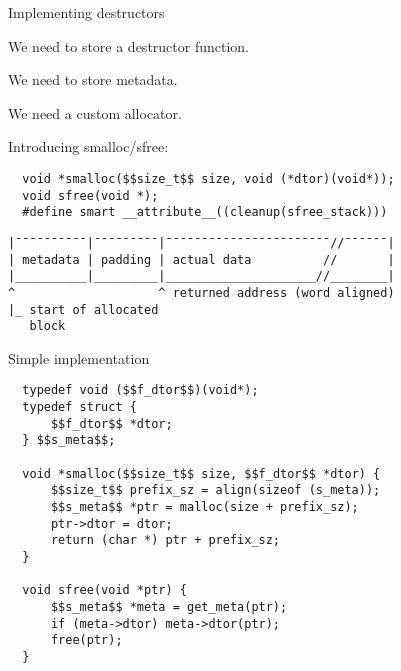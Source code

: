 \documentclass[10pt]{beamer}
\begin{document}
\begin{frame}[fragile]{Implementing destructors}

  We need to store a destructor function.

  We need to store metadata.

  We need a custom allocator.

  Introducing smalloc/sfree:

  \begin{lstlisting}
  void *smalloc($$size_t$$ size, void (*dtor)(void*));
  void sfree(void *);
  #define smart __attribute__((cleanup(sfree_stack)))
  \end{lstlisting}

  \begin{verbatim}
|¯¯¯¯¯¯¯¯¯¯|¯¯¯¯¯¯¯¯¯|¯¯¯¯¯¯¯¯¯¯¯¯¯¯¯¯¯¯¯¯¯¯¯//¯¯¯¯¯¯|
| metadata | padding | actual data          //       |
|__________|_________|_____________________//________|
^                    ^ returned address (word aligned)
|_ start of allocated
   block
  \end{verbatim}

\end{frame}

\begin{frame}[fragile]{Simple implementation}
  \begin{lstlisting}
  typedef void ($$f_dtor$$)(void*);
  typedef struct {
      $$f_dtor$$ *dtor;
  } $$s_meta$$;

  void *smalloc($$size_t$$ size, $$f_dtor$$ *dtor) {
      $$size_t$$ prefix_sz = align(sizeof (s_meta));
      $$s_meta$$ *ptr = malloc(size + prefix_sz);
      ptr->dtor = dtor;
      return (char *) ptr + prefix_sz;
  }

  void sfree(void *ptr) {
      $$s_meta$$ *meta = get_meta(ptr);
      if (meta->dtor) meta->dtor(ptr);
      free(ptr);
  }
  \end{lstlisting}
\end{frame}
\end{document}

